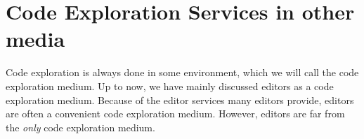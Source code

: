 
%
%




\section{Code Exploration Services in other media}\label{sec:code-exploration-services-in-other-media}

Code exploration is always done in some environment, which we will call the code exploration medium.
Up to now, we have mainly discussed editors as a code exploration medium.
Because of the editor services many editors provide, editors are often a convenient code exploration medium.
However, editors are far from the \emph{only} code exploration medium.

